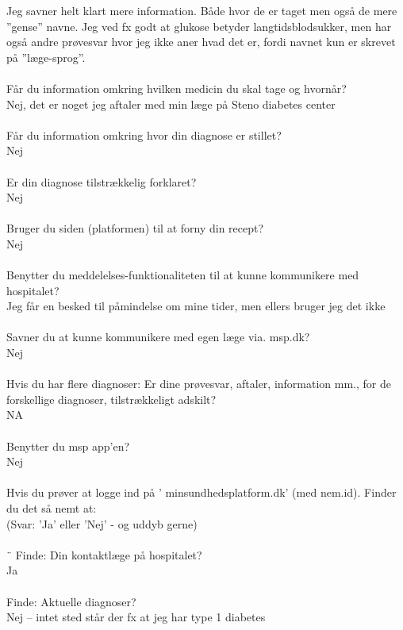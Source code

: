 \documentclass[english]{article}
\begin{document}
Jeg savner helt klart mere information. Både hvor de er taget men også de mere ”gense” navne. Jeg ved fx godt at glukose betyder langtidsblodsukker, men har også andre prøvesvar hvor jeg ikke aner hvad det er, fordi navnet kun er skrevet på ”læge-sprog”.
\\ \\
Får du information omkring hvilken medicin du skal tage og hvornår?\\
Nej, det er noget jeg aftaler med min læge på Steno diabetes center
\\ \\
Får du information omkring hvor din diagnose er stillet?\\
Nej
\\ \\
Er din diagnose tilstrækkelig forklaret?\\
Nej
\\ \\
Bruger du siden (platformen) til at forny din recept?\\
Nej
\\ \\
Benytter du meddelelses-funktionaliteten til at kunne kommunikere med hospitalet?\\
Jeg får en besked til påmindelse om mine tider, men ellers bruger jeg det ikke
\\ \\
Savner du at kunne kommunikere med egen læge via. msp.dk?\\
Nej
\\ \\
Hvis du har flere diagnoser: Er dine prøvesvar, aftaler, information mm., for de forskellige diagnoser, tilstrækkeligt adskilt?\\
NA
\\ \\
Benytter du msp app’en?\\
Nej
\\ \\
Hvis du prøver at logge ind på ’ minsundhedsplatform.dk’ (med nem.id). Finder du det så nemt at:\\
(Svar: ’Ja’ eller ’Nej’ - og uddyb gerne)
\\ \\¨
Finde: Din kontaktlæge på hospitalet?\\
Ja
\\ \\
Finde: Aktuelle diagnoser?\\
Nej – intet sted står der fx at jeg har type 1 diabetes 
\end{document}
